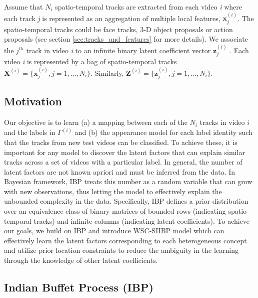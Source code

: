 \documentclass[runningheads]{llncs}
\begin{document}
Assume that $N_i$ spatio-temporal tracks are extracted from each video \textit{i} where each track \textit{j} is represented as an aggregation of multiple local features, $\mathbf{x}^{(i)}_j$. The spatio-temporal tracks could be face tracks, 3-D object proposals or action proposals (see section \ref{sec:tracks_and_features} for more details). We associate the $j^{th}$ track in video \textit{i} to an infinite binary latent coefficient vector $\mathbf{z}_{j}^{(i)}$ \cite{ghahramani2005infinite,shi2014weakly}. Each video \textit{i} is represented by a bag of spatio-temporal tracks $ \mathbf{X}^{(i)}  = \{\mathbf{x}^{(i)}_j, j = 1,\dots,N_i\}$. Similarly, $ \mathbf{Z}^{(i)}  = \{\mathbf{z}^{(i)}_j, j = 1,\dots,N_i\}$.

\subsection{Motivation}
\label{motivation}

Our objective is to learn (a) a mapping between each of the $N_i$ tracks in video $i$ and the labels in $\Gamma^{(i)}$ and (b) the appearance model for each label identity such that the tracks from new test videos can be classified. To achieve these, it is important for any model to discover the latent factors that can explain similar tracks across a set of videos with a particular label.
In general, the number of latent factors are not known apriori and must be inferred from the data. In Bayesian framework, IBP treats this number as a random variable that can grow with new observations, thus letting the model to effectively explain the unbounded complexity in the data. Specifically, IBP defines a prior distribution over an equivalence class of binary matrices of bounded rows (indicating spatio-temporal tracks) and infinite columns (indicating latent coefficients). To achieve our goals, we build on IBP and introduce WSC-SIIBP model which can effectively learn the latent factors corresponding to each  heterogeneous concept and utilize prior location constraints to reduce the ambiguity in the learning through the knowledge of other latent coefficients.

\vspace{-3mm}
\subsection{Indian Buffet Process (IBP)}
\label{sssec:sibp}
\end{document}
